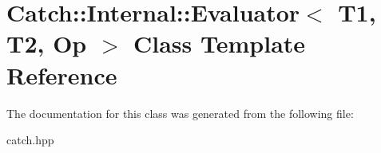 \hypertarget{classCatch_1_1Internal_1_1Evaluator}{}\section{Catch\+:\+:Internal\+:\+:Evaluator$<$ T1, T2, Op $>$ Class Template Reference}
\label{classCatch_1_1Internal_1_1Evaluator}


The documentation for this class was generated from the following file\+:\begin{DoxyCompactItemize}
\item 
catch.\+hpp\end{DoxyCompactItemize}
